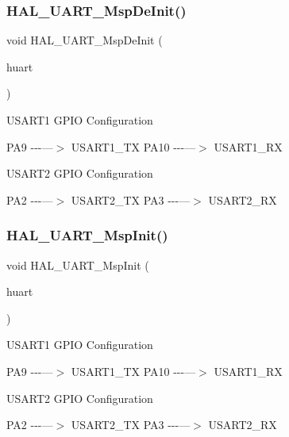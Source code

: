 \subsubsection{\texorpdfstring{HAL\_UART\_MspDeInit()}{HAL\_UART\_MspDeInit()}}
{\footnotesize\ttfamily void H\+A\+L\+\_\+\+U\+A\+R\+T\+\_\+\+Msp\+De\+Init (\begin{DoxyParamCaption}\item[{\mbox{\hyperlink{group___u_a_r_t___exported___types_ga7adf4f3e4c3ecde572be5925c915a967}{U\+A\+R\+T\+\_\+\+Handle\+Type\+Def}} $\ast$}]{huart }\end{DoxyParamCaption})}

U\+S\+A\+R\+T1 G\+P\+IO Configuration

P\+A9 -\/-\/-\/---$>$ U\+S\+A\+R\+T1\+\_\+\+TX P\+A10 -\/-\/-\/---$>$ U\+S\+A\+R\+T1\+\_\+\+RX

U\+S\+A\+R\+T2 G\+P\+IO Configuration

P\+A2 -\/-\/-\/---$>$ U\+S\+A\+R\+T2\+\_\+\+TX P\+A3 -\/-\/-\/---$>$ U\+S\+A\+R\+T2\+\_\+\+RX\mbox{\label{group___u_a_r_t___exported___functions___group1_ga0e553b32211877322f949b14801bbfa7}} 
\subsubsection{\texorpdfstring{HAL\_UART\_MspInit()}{HAL\_UART\_MspInit()}}
{\footnotesize\ttfamily void H\+A\+L\+\_\+\+U\+A\+R\+T\+\_\+\+Msp\+Init (\begin{DoxyParamCaption}\item[{\mbox{\hyperlink{group___u_a_r_t___exported___types_ga7adf4f3e4c3ecde572be5925c915a967}{U\+A\+R\+T\+\_\+\+Handle\+Type\+Def}} $\ast$}]{huart }\end{DoxyParamCaption})}

U\+S\+A\+R\+T1 G\+P\+IO Configuration

P\+A9 -\/-\/-\/---$>$ U\+S\+A\+R\+T1\+\_\+\+TX P\+A10 -\/-\/-\/---$>$ U\+S\+A\+R\+T1\+\_\+\+RX

U\+S\+A\+R\+T2 G\+P\+IO Configuration

P\+A2 -\/-\/-\/---$>$ U\+S\+A\+R\+T2\+\_\+\+TX P\+A3 -\/-\/-\/---$>$ U\+S\+A\+R\+T2\+\_\+\+RX